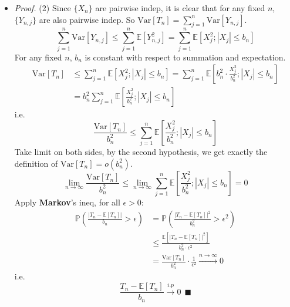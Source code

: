 \documentclass[a4paper,12pt,twoside]{book}
\begin{document}
\begin{itemize}
	\item[]\textit{Proof.} (2) Since $\{X_n\}$ are pairwise indep, it is clear that for any fixed $n$, $\{Y_{n,j}\}$ are also pairwise indep. So $\mathrm{Var}\left[T_n\right]=\sum_{j=1}^n \mathrm{Var}\left[Y_{n,j}\right]$.
	\begin{equation}
		\sum_{j=1}^n\mathrm{Var}\left[Y_{n,j}\right]\leq \sum_{j=1}^n \mathbb{E}\left[Y_{n,j}^2\right]=\sum_{j=1}^n \mathbb{E}\left[X_j^2; |X_j|\leq b_n\right]
	\end{equation}
	For any fixed $n$, $b_n$ is constant with respect to summation and expectation.
	\begin{equation}
		\begin{split}
			\mathrm{Var}\left[T_n\right]&\leq \sum_{j=1}^n \mathbb{E}\left[X_j^2; |X_j|\leq b_n\right]=\sum_{j=1}^n \mathbb{E}\left[b_n^2\cdot \frac{X_j^2}{b_n^2}; |X_j|\leq b_n\right]\\
			&=b_n^2\sum_{j=1}^n \mathbb{E}\left[\frac{X_j^2}{b_n^2}; |X_j|\leq b_n\right]
		\end{split}
	\end{equation}
	i.e.
	\begin{equation}
		\frac{\mathrm{Var}\left[T_n\right]}{b_n^2}\leq \sum_{j=1}^n\mathbb{E}\left[\frac{X_j^2}{b_n^2}; |X_j|\leq b_n\right]
	\end{equation}
	Take limit on both sides, by the second hypothesis, we get exactly the definition of $\mathrm{Var}\left[T_n\right]=o(b_n^2)$.
	\begin{equation}
		\lim\limits_{n\rightarrow\infty}\frac{\mathrm{Var}\left[T_n\right]}{b_n^2}\leq \lim\limits_{n\rightarrow\infty}\sum_{j=1}^n\mathbb{E}\left[\frac{X_j^2}{b_n^2}; |X_j|\leq b_n\right]=0
	\end{equation}
	Apply \textbf{Markov}'s ineq, for all $\epsilon>0$:
	\begin{equation}
		\begin{split}
			\mathbb{P}\left(\frac{|T_n - \mathbb{E}\left[T_n\right]|}{b_n}>\epsilon\right)&=\mathbb{P}\left(\frac{|T_n - \mathbb{E}\left[T_n\right]|^2}{b^2_n}>\epsilon^2\right)\\
			&\leq \frac{\mathbb{E}\left[|T_n - \mathbb{E}\left[T_n\right]|^2\right]}{b_n^2\cdot \epsilon^2}\\
			&=\frac{\mathrm{Var}\left[T_n\right]}{b_n^2}\cdot \frac{1}{\epsilon^2} \xrightarrow{n\to \infty} 0
		\end{split}
	\end{equation}
	i.e.
	\begin{equation}
		\frac{T_n - \mathbb{E}\left[T_n\right]}{b_n} \xrightarrow{i.p} 0~~\blacksquare
	\end{equation}


\end{itemize}
\end{document}
